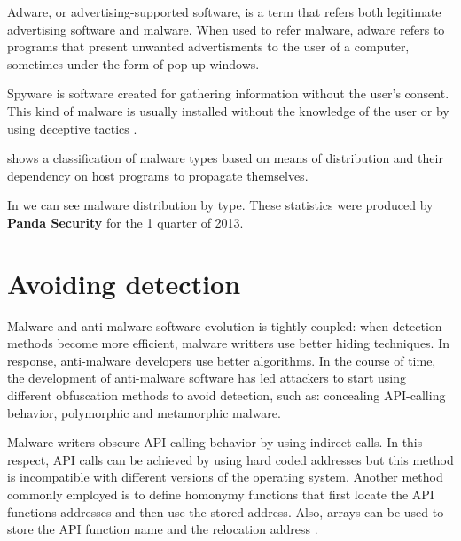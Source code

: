 Adware, or advertising-supported software, is a term that refers both legitimate advertising software and malware. When used to refer malware, adware refers to programs that present unwanted advertisments to the user of a computer, sometimes under the form of pop-up windows.

Spyware is software created for gathering information without the user's consent. This kind of malware is usually installed without the knowledge of the user or by using deceptive tactics \cite{mal-behavior-analysis}.


 shows a classification of malware types based on means of distribution and their dependency on host programs to propagate themselves.


In  we can see malware distribution by type. These statistics were produced by \textbf{Panda Security} for the 1 quarter of 2013. 


\section{Avoiding detection}
\label{sec:avoid-det}

Malware and anti-malware software evolution is tightly coupled: when detection methods become more efficient, malware writters use better hiding techniques. In response, anti-malware developers use better algorithms. In the course of time, the development of anti-malware software has led attackers to start using different obfuscation methods to avoid detection, such as: concealing API-calling behavior, polymorphic and metamorphic malware.

Malware writers obscure API-calling behavior by using indirect calls. In this respect, API calls can be achieved by using hard coded addresses but this method is incompatible with different versions of the operating system. Another method commonly employed is to define homonymy functions that first locate the API functions addresses and then use the stored address. Also, arrays can be used to store the API function name and the relocation address \cite{static-detection-behavior}.

